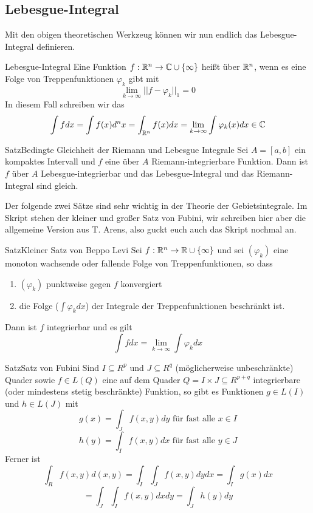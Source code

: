 \subsection{Lebesgue-Integral}
Mit den obigen theoretischen Werkzeug können wir nun endlich das Lebesgue-Integral definieren.
\begin{Def}{Lebesgue-Integral}
Eine Funktion $f:\mathbb{R}^n\rightarrow\mathbb{C}\cup\{\infty\}$ heißt  über $\mathbb{R}^n$, wenn es eine Folge von Treppenfunktionen $\varphi_k$ gibt mit
$$\lim_{k\rightarrow \infty}||f-\varphi_k||_1=0$$
In diesem Fall schreiben wir das 
$$\int fdx = \int f(x) d^nx = \int_{\mathbb{R}^n} f(x)dx = \lim_{k\rightarrow\infty}\int \varphi_k(x)dx\in\mathbb{C}$$
\end{Def}
\begin{Satz}{Satz}{Bedingte Gleichheit der Riemann und Lebesgue Integrale}
Sei $A=[a,b]$ ein kompaktes Intervall und $f$ eine über $A$ Riemann-integrierbare Funktion. Dann ist $f$ über $A$ Lebesgue-integrierbar und das Lebesgue-Integral und das Riemann-Integral sind gleich.
\end{Satz}
Der folgende zwei Sätze sind sehr wichtig in der Theorie der Gebietsintegrale. Im Skript stehen der kleiner und großer Satz von Fubini, wir schreiben hier aber die allgemeine Version aus T. Arens, also guckt euch auch das Skript nochmal an.
\begin{Satz}{Satz}{Kleiner Satz von Beppo Levi}
Sei $f:\mathbb{R}^n\rightarrow \mathbb{R}\cup \{\infty\}$ und sei $(\varphi_k)$ eine monoton wachsende oder fallende Folge von Treppenfunktionen, so dass
\begin{enumerate}
    \item $(\varphi_k)$ punktweise gegen $f$ konvergiert
    \item die Folge ($\int \varphi_k dx$) der Integrale der Treppenfunktionen beschränkt ist.

\end{enumerate}
    Dann ist $f$ integrierbar und es gilt
    $$\int f dx=\lim_{k\rightarrow \infty}\int \varphi_k dx$$
\end{Satz}
\begin{Satz}{Satz}{Satz von Fubini}
Sind $I\subseteq R^p$ und $J\subseteq R^q$ (möglicherweise unbeschränkte) Quader sowie $f\in L(Q)$ eine auf dem Quader $Q=I\times J \subseteq R^{p+q}$ integrierbare (oder mindestens stetig beschränkte) Funktion, so gibt es Funktionen $g\in L(I)$ und $h\in L(J)$ mit
$$g(x)=\int_J f(x,y) dy \mbox{ für fast alle $x\in I$}$$
$$h(y)=\int_I f(x,y)dx \mbox{ für fast alle $y\in J$}$$
Ferner ist 
$$\int_R f(x,y) d(x,y) = \int_I\int_J f(x,y) dy dx = \int_I g(x) dx$$
$$=\int_J\int_I f(x,y) dx dy = \int_J h(y) dy$$

\end{Satz}
